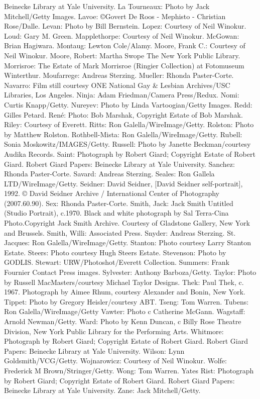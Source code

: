 Beinecke Library at Yale University. La Tourneaux: Photo by Jack
Mitchell/Getty Images. Lavoe: ©Govert De Roos - Mephisto - Christian
Rose/Dalle. Levan: Photo by Bill Bernstein. Lopez: Courtesy of Neil
Winokur. Loud: Gary M. Green. Mapplethorpe: Courtesy of Neil Winokur.
McGowan: Brian Hagiwara. Montaug: Lewton Cole/Alamy. Moore, Frank C.:
Courtesy of Neil Winokur. Moore, Robert: Martha Swope The New York
Public Library. Morrisroe: The Estate of Mark Morrisroe (Ringier
Collection) at Fotomuseum Winterthur. Moufarrege: Andreas Sterzing.
Mueller: Rhonda Paster-Corte. Navarro: Film still courtesy ONE National
Gay \& Lesbian Archives/USC Libraries, Los Angeles. Ninja: Adam
Friedman/Camera Press/Redux. Nomi: Curtis Knapp/Getty. Nureyev: Photo by
Linda Vartoogian/Getty Images. Redd: Gilles Petard. René: Photo: Bob
Marshak, Copyright Estate of Bob Marshak. Riley: Courtesy of Everett.
Ritts: Ron Galella/WireImage/Getty. Rolston: Photo by Matthew Rolston.
Rothbell-Mista: Ron Galella/WireImage/Getty. Rubell: Sonia
Moskowitz/IMAGES/Getty. Russell: Photo by Janette Beckman/courtesy
Audika Records. Saint: Photograph by Robert Giard; Copyright Estate of
Robert Giard. Robert Giard Papers: Beinecke Library at Yale University.
Sanchez: Rhonda Paster-Corte. Savard: Andreas Sterzing. Seales: Ron
Gallela LTD/WireImage/Getty. Seidner: David Seidner, {[}David Seidner
self-portrait{]}, 1992. © David Seidner Archive / International Center
of Photography (2007.60.90). Sex: Rhonda Paster-Corte. Smith, Jack: Jack
Smith Untitled (Studio Portrait), c.1970. Black and white photograph by
Sal Terra-Cina Photo.Copyright Jack Smith Archive. Courtesy of Gladstone
Gallery, New York and Brussels. Smith, Willi: Associated Press. Snyder:
Andreas Sterzing. St. Jacques: Ron Galella/WireImage/Getty. Stanton:
Photo courtesy Larry Stanton Estate. Steers: Photo courtesy Hugh Steers
Estate. Stevenson: Photo by GODLIS. Stewart: URW/Photoshot/Everett
Collection. Summers: Frank Fournier Contact Press images. Sylvester:
Anthony Barboza/Getty. Taylor: Photo by Russell MacMasters/courtesy
Michael Taylor Designs. Thek: Paul Thek, c. 1967. Photograph by Aimee
Rhum, courtesy Alexander and Bonin, New York. Tippet: Photo by Gregory
Heisler/courtesy ABT. Tseng: Tom Warren. Tubens: Ron
Galella/WireImage/Getty Vawter: Photo c Catherine McGann. Wagstaff:
Arnold Newman/Getty. Ward: Photo by Kenn Duncan, c Billy Rose Theatre
Division, New York Public Library for the Performing Arts. Whitmore:
Photograph by Robert Giard; Copyright Estate of Robert Giard. Robert
Giard Papers: Beinecke Library at Yale University. Wilson: Lynn
Goldsmith/VCG/Getty. Wojnarowicz: Courtesy of Neil Winokur. Wolfe:
Frederick M Brown/Stringer/Getty. Wong: Tom Warren. Yates Rist:
Photograph by Robert Giard; Copyright Estate of Robert Giard. Robert
Giard Papers: Beinecke Library at Yale University. Zane: Jack
Mitchell/Getty.

